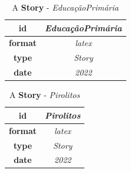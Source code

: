 \documentclass{article}
\begin{document}
		\begin{table}[ht!]
			\centering
			\begin{tabular}{|c|c|}
				\hline
				
					\textbf{ id } & \textit{ EducaçãoPrimária } \\
					\hline
				
					\textbf{ format } & \textit{ latex } \\
					\hline
				
					\textbf{ type } & \textit{ Story } \\
					\hline
				
					\textbf{ date } & \textit{ 2022 } \\
					\hline
				
			\end{tabular}
			\caption{A \textbf{ Story }-\textit{ EducaçãoPrimária }} %
			\label{table:\arabic{tablecounter2}} %
		\end{table}
	
		\begin{table}[ht!]
			\centering
			\begin{tabular}{|c|c|}
				\hline
				
					\textbf{ id } & \textit{ Pirolitos } \\
					\hline
				
					\textbf{ format } & \textit{ latex } \\
					\hline
				
					\textbf{ type } & \textit{ Story } \\
					\hline
				
					\textbf{ date } & \textit{ 2022 } \\
					\hline
				
			\end{tabular}
			\caption{A \textbf{ Story }-\textit{ Pirolitos }} %
			\label{table:\arabic{tablecounter2}} %
		\end{table}
	
\end{document}
